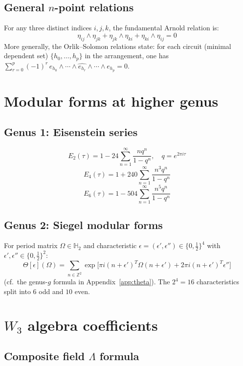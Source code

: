 \subsection{\texorpdfstring{General $n$-point relations}{General n-point relations}}

For any three distinct indices $i, j, k$, the fundamental Arnold relation is:
\[\eta_{ij} \wedge \eta_{jk} + \eta_{jk} \wedge \eta_{ki} + \eta_{ki} \wedge \eta_{ij} = 0\]
More generally, the Orlik--Solomon relations state: for each circuit (minimal dependent set) $\{h_0, \ldots, h_p\}$ in the arrangement, one has $\sum_{r=0}^{p} (-1)^r \, e_{h_0} \wedge \cdots \wedge \widehat{e_{h_r}} \wedge \cdots \wedge e_{h_p} = 0$.

\section{Modular forms at higher genus}

\subsection{Genus 1: Eisenstein series}

\[E_2(\tau) = 1 - 24\sum_{n=1}^\infty \frac{nq^n}{1-q^n}, \quad q = e^{2\pi i \tau}\]
\[E_4(\tau) = 1 + 240\sum_{n=1}^\infty \frac{n^3q^n}{1-q^n}\]
\[E_6(\tau) = 1 - 504\sum_{n=1}^\infty \frac{n^5q^n}{1-q^n}\]

\subsection{Genus 2: Siegel modular forms}

For period matrix $\Omega \in \mathbb{H}_2$ and characteristic $\epsilon = (\epsilon', \epsilon'') \in \{0, \tfrac{1}{2}\}^4$ with $\epsilon', \epsilon'' \in \{0, \tfrac{1}{2}\}^2$:
\[\Theta[\epsilon](\Omega) = \sum_{n \in \mathbb{Z}^2} \exp\bigl[\pi i(n+\epsilon')^T \Omega (n+\epsilon') + 2\pi i(n+\epsilon')^T \epsilon''\bigr]\]
(cf.\ the genus-$g$ formula in Appendix~\ref{app:theta}). The $2^4 = 16$ characteristics split into $6$ odd and $10$ even.

\section{\texorpdfstring{$W_3$ algebra coefficients}{W-3 algebra coefficients}}
\label{app:w3-coefficients}
\label{app:w3-jacobi-full}

\subsection{\texorpdfstring{Composite field $\Lambda$ formula}{Composite field formula}}

